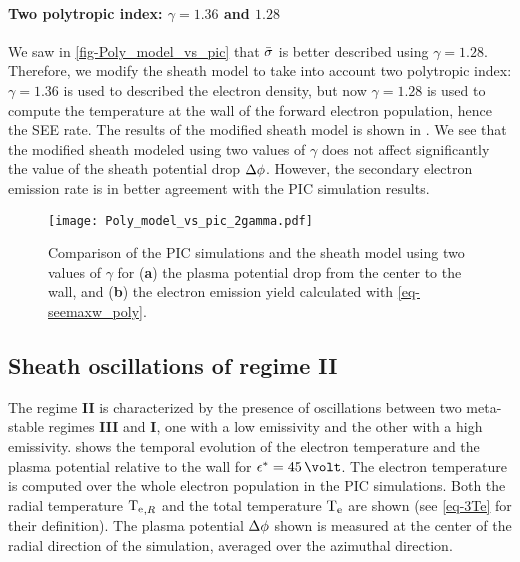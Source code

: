     \paragraph{Two polytropic index: $\gamma=1.36$ and $1.28$\\}
    We saw in \cref{fig-Poly_model_vs_pic} that $ \bar{\sigma }$ is better described using $\gamma=1.28$.
    Therefore, we modify the sheath model to take into account two polytropic index\string: $\gamma=1.36$ is used to described the electron density, but now $\gamma=1.28$ is used to compute the temperature at the wall of the forward electron population, hence the  \ac{SEE} rate.
    The results of the modified sheath model is shown in .
    We see that the modified sheath modeled using two values of $\gamma$ does not affect significantly the value of the sheath potential drop $\Delta \phi$.
    However, the secondary electron emission rate is in better agreement with the \ac{PIC} simulation results.
    
    \begin{figure}[!hbt]
      \centering
      \texttt{[image: Poly\_model\_vs\_pic\_2gamma.pdf]}
      \caption{Comparison of the PIC simulations and the sheath model using two values of $\gamma$ for ({\bf a}) the plasma potential drop from the center to the wall, and ({\bf b}) the electron emission yield calculated with \cref{eq-seemaxw_poly}. }
      \label{fig-Poly_model_vs_pic2}
    \end{figure}
    
    
    
  \subsection{Sheath oscillations of regime {\bf II}} \label{subsec-pic_scheath_RSO}
  
    The regime {\bf II} is characterized by the presence of oscillations between two meta-stable regimes {\bf III} and {\bf I}, one with a low emissivity and the other with a high emissivity.
     shows the temporal evolution of the electron temperature and the plasma potential relative to the wall for $\crover=45\,\volt$.
    The electron temperature is computed over the whole electron population in the \ac{PIC} simulations.
    Both the radial temperature $\mathrm{T_e}_{,R}$ and the total temperature $\mathrm{T_e}$ are shown (see \cref{eq-3Te} for their definition).
    The plasma potential $\Delta \phi$ shown is measured at the center of the radial direction of the simulation, averaged over the azimuthal direction.
    
